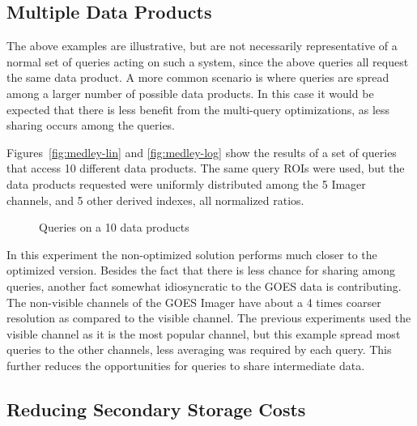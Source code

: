 \documentclass{ucdthesis}       %
\begin{document}
\subsection{Multiple Data Products}

The above examples are illustrative, but are not necessarily
representative of a normal set of queries acting on such a system,
since the above queries all request the same data product.  A more
common scenario is where queries are spread among a larger
number of possible data products.  In this case it would be expected
that there is less benefit from the multi-query optimizations, as less
sharing occurs among the queries.

Figures~\ref{fig:medley-lin} and \ref{fig:medley-log} show the results
of a set of queries that access 10 different data products.  The same
query \acp{ROI} were used, but the data products requested were
uniformly distributed among the 5 Imager channels, and 5 other derived
indexes, all normalized ratios.

\begin{figure}[htb]
  \centering
  \caption{Queries on a 10 data products}
\end{figure}

In this experiment the non-optimized solution performs much closer to
the optimized version.  Besides the fact that there is less chance for
sharing among queries, another fact somewhat idiosyncratic to the
\ac{GOES} data is contributing.  The non-visible channels of the
\ac{GOES} Imager have about a 4 times coarser resolution as compared
to the visible channel.  The previous experiments used the visible
channel as it is the most popular channel, but this example spread
most queries to the other channels, less averaging was required by
each query.  This further reduces the opportunities for queries to
share intermediate data.


\subsection{Reducing Secondary Storage Costs}
\end{document}
